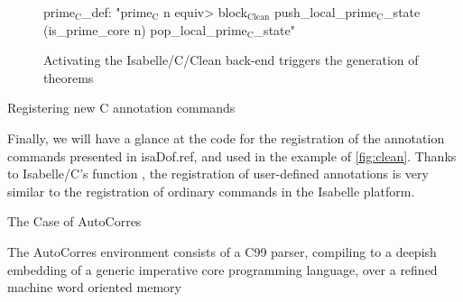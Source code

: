 \begin{isabellebody}
\begin{isamarkuptext}
\begin{figure}
\begin{minipage}{0.45\linewidth}
\begin{isar}
prime$_{\text{C}}$_def: "prime$_{\text{C}}$ n \<equiv>
  block$_{\text{Clean}}$ push_local_prime$_{\text{C}}$_state
             (is_prime_core n)
             pop_local_prime$_{\text{C}}$_state"
\end{isar}
  \end{minipage}
  \caption{Activating the Isabelle/C/Clean back-end triggers the generation of theorems}
  \label{fig:clean}
\end{figure}%
\end{isamarkuptext}\isamarkuptrue%
%
\begin{isamarkupfigure*}%
[label = {C-sample10},type = {Isa_COL.figure}, args={label = {C-sample10},type = {Isa_COL.figure}, Isa_COL.figure.relative_width = {40}, Isa_COL.figure.src = {figures/A-C-Source10}, Isa_COL.figure.spawn_columns = {True}}]Registering new C annotation commands%
\end{isamarkupfigure*}\isamarkuptrue%
%
\begin{isamarkuptext}%
Finally, we will have a glance at the code for the registration of the annotation commands presented
in \csname isaDof.ref, and used in the example of \autoref{fig:clean}. Thanks to
Isabelle/C's function , the registration of
user-defined annotations is very similar to the registration of ordinary commands in the Isabelle
platform.%
\end{isamarkuptext}\isamarkuptrue%
%
\begin{isamarkupsubsection*}%
[label = {autocorres},type = {scholarly_paper.technical}, args={label = {autocorres},type = {scholarly_paper.technical}, Isa_COL.text_element.level = {}, Isa_COL.text_element.referentiable = {False}, Isa_COL.text_element.variants = {{STR ''outline'', STR ''document''}}, scholarly_paper.text_section.main_author = {}, scholarly_paper.text_section.fixme_list = {}, Isa_COL.text_element.level = {}, scholarly_paper.technical.definition_list = {}}]The Case of AutoCorres%
\end{isamarkupsubsection*}\isamarkuptrue%
%
\begin{isamarkuptext}%
The AutoCorres environment consists of a C99 parser, compiling to a deepish embedding
of a generic imperative core programming language, over a refined machine word oriented memory

\end{isamarkuptext}
\end{isabellebody}
